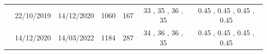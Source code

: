 \documentclass[authoryear,review,12pt]{elsarticle}
\begin{document}
\begin{table}[htbp]
{\begin{adjustwidth}{-0.45in}{0in}
\begin{tabular}{ccccccc}
				& 22/10/2019                      & 14/12/2020                    & 1060                       & 167                       & 33                          , 35                          , 36                          , 35                          & 0.45                        , 0.45                        , 0.45                        , 0.45                        \\
				& 14/12/2020                      & 14/03/2022                    & 1184                       & 287                       & 34                          , 36                          , 36                          , 35                          & 0.45                        , 0.45                        , 0.45                        , 0.45                        \\
				\bottomrule
			\end{tabular}
		\end{adjustwidth}
		\label{tab:table1}
	}	
\end{table}
\restoregeometry

\newpage
\end{document}
